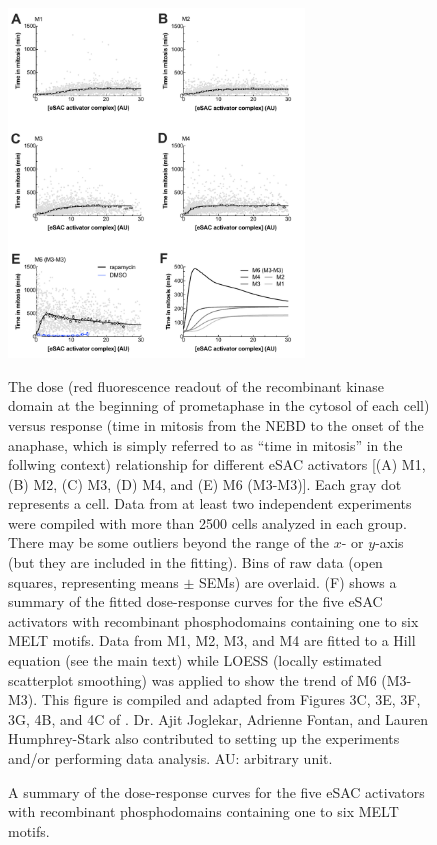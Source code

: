 \begin{figure}
    \centering
    \includegraphics[width=0.7\textwidth]{chapters/figures/DoseResponse.pdf}
    \caption{A summary of the dose-response curves for the five eSAC activators with recombinant phosphodomains containing one to six MELT motifs.}
    \noindent\justifying The dose (red fluorescence readout of the recombinant  kinase domain at the beginning of prometaphase in the cytosol of each cell) versus response (time in mitosis from the NEBD to the onset of the anaphase, which is simply referred to as ``time in mitosis'' in the follwing context) relationship for different eSAC activators [(A) M1, (B) M2, (C) M3, (D) M4, and (E) M6 (M3-M3)]. Each gray dot represents a cell. Data from at least two independent experiments were compiled with more than \SI{2500}{} cells analyzed in each group. There may be some outliers beyond the range of the $x$- or $y$-axis (but they are included in the fitting). Bins of raw data (open squares, representing means $\pm$ SEMs) are overlaid. (F) shows a summary of the fitted dose-response curves for the five eSAC activators with recombinant phosphodomains containing one to six MELT motifs. Data from M1, M2, M3, and M4 are fitted to a Hill equation (see the main text) while LOESS (locally estimated scatterplot smoothing) was applied to show the trend of M6 (M3-M3). This figure is compiled and adapted from Figures 3C, 3E, 3F, 3G, 4B, and 4C of \cite{eSAC}. Dr. Ajit Joglekar, Adrienne Fontan, and Lauren Humphrey-Stark also contributed to setting up the experiments and/or performing data analysis. AU: arbitrary unit.
    \label{DoseResponse}
\end{figure}

